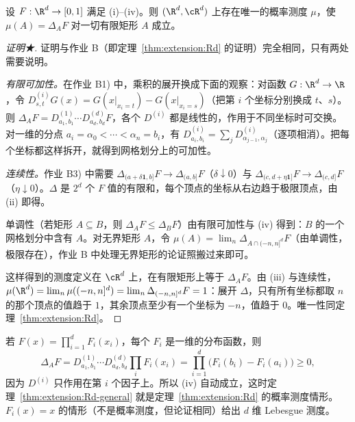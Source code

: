 \begin{theorem}\label{thm:extension:Rd-general}
设 $F:\R^d\to[0,1]$ 满足 (i)--(iv)。则 $(\R^d,\cR^d)$ 上存在唯一的概率测度 $\mu$，使 $\mu(A)=\Delta_AF$ 对一切有限矩形 $A$ 成立。
\end{theorem}
\begin{proof}[证明★]
证明与作业 B（即定理~\ref{thm:extension:Rd} 的证明）完全相同，只有两处需要说明。

\emph{有限可加性。}在作业 B1) 中，乘积的展开换成下面的观察：对函数 $G:\R^d\to\R$，令 $D^{(i)}_{s,t}G(x)=G(x|_{x_i=t})-G(x|_{x_i=s})$（把第 $i$ 个坐标分别换成 $t$、$s$）。则 $\Delta_AF=D^{(1)}_{a_1,b_1}\cdots D^{(d)}_{a_d,b_d}F$，各个 $D^{(i)}$ 都是线性的，作用于不同坐标时可交换。对一维的分点 $a_i=\alpha_0<\cdots<\alpha_n=b_i$，有 $D^{(i)}_{a_i,b_i}=\sum_jD^{(i)}_{\alpha_{j-1},\alpha_j}$（逐项相消）。把每个坐标都这样拆开，就得到网格划分上的可加性。

\emph{连续性。}作业 B3) 中需要 $\Delta_{(a+\delta\mathbf 1,b]}F\to\Delta_{(a,b]}F$（$\delta\downarrow0$）与 $\Delta_{(c,d+\eta\mathbf 1]}F\to\Delta_{(c,d]}F$（$\eta\downarrow0$）。$\Delta$ 是 $2^d$ 个 $F$ 值的有限和，每个顶点的坐标从右边趋于极限顶点，由 (ii) 即得。

单调性（若矩形 $A\subseteq B$，则 $\Delta_AF\leqslant\Delta_BF$）由有限可加性与 (iv) 得到：$B$ 的一个网格划分中含有 $A$。对无界矩形 $A$，令 $\mu(A)=\lim_n\Delta_{A\cap(-n,n]^d}F$（由单调性，极限存在），作业 B 中处理无界矩形的论证照搬过来即可。

这样得到的测度定义在 $\cR^d$ 上，在有限矩形上等于 $\Delta_AF$。由 (iii) 与连续性，$\mu(\R^d)=\lim_n\mu((-n,n]^d)=\lim_n\Delta_{(-n,n]^d}F=1$：展开 $\Delta$，只有所有坐标都取 $n$ 的那个顶点的值趋于 $1$，其余顶点至少有一个坐标为 $-n$，值趋于 $0$。唯一性同定理~\ref{thm:extension:Rd}。
\end{proof}

\begin{example}[乘积型]
若 $F(x)=\prod_{i=1}^dF_i(x_i)$，每个 $F_i$ 是一维的分布函数，则
\[
\Delta_AF=D^{(1)}_{a_1,b_1}\cdots D^{(d)}_{a_d,b_d}\prod_iF_i(x_i)=\prod_{i=1}^d\bigl(F_i(b_i)-F_i(a_i)\bigr)\geqslant0,
\]
因为 $D^{(i)}$ 只作用在第 $i$ 个因子上。所以 (iv) 自动成立，这时定理~\ref{thm:extension:Rd-general} 就是定理~\ref{thm:extension:Rd} 的概率测度情形。$F_i(x)=x$ 的情形（不是概率测度，但论证相同）给出 $d$ 维 Lebesgue 测度。
\end{example}


